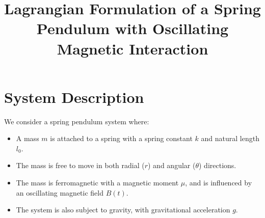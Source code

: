 \documentclass[12pt]{article}
\title{Lagrangian Formulation of a Spring Pendulum with Oscillating Magnetic Interaction}
\author{}
\date{}
\begin{document}
\maketitle
\tableofcontents

\section{System Description}
We consider a spring pendulum system where:
\begin{itemize}
    \item A mass \( m \) is attached to a spring with a spring constant \( k \) and natural length \( l_0 \).
    \item The mass is free to move in both radial (\( r \)) and angular (\( \theta \)) directions.
    \item The mass is ferromagnetic with a magnetic moment \( \mu \), and is influenced by an oscillating magnetic field \( B(t) \).
    \item The system is also subject to gravity, with gravitational acceleration \( g \).
\end{itemize}
\end{document}
